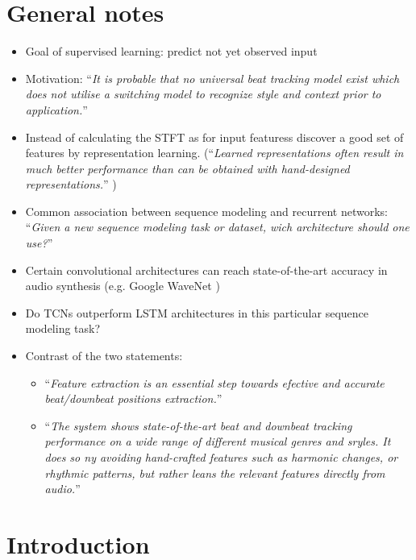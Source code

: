 \documentclass{scrartcl}
\begin{document}
\pagestyle{empty}


\tableofcontents
\newpage


\section*{General notes}
\begin{itemize}
\item Goal of supervised learning: predict not yet observed input
\item Motivation: ``\emph{It is probable that no universal beat tracking model exist which does not utilise a switching model to recognize style and context prior to application.}'' \cite[Collins2006]{Collins2006}
\item Instead of calculating the STFT as for input featuress discover a good set of features by representation learning. (``\emph{Learned representations often result in much better performance than can be obtained with hand-designed representations.}'' \cite[Goodfellow2016]{Goodfellow2016})
\item Common association between sequence modeling and recurrent networks: ``\emph{Given a new sequence modeling task or dataset, wich architecture should one use?}'' \cite[Bai2018]{Bai2018}
\item Certain convolutional architectures can reach state-of-the-art accuracy in audio synthesis (e.g. Google WaveNet \cite[Oord2016]{Oord2016})
\item Do TCNs outperform LSTM architectures in this particular sequence modeling task?
\item Contrast of the two statements:
\begin{itemize}
\item ``\emph{Feature extraction is an essential step towards efective and accurate beat/downbeat positions extraction.}'' \cite[Khadkevich2012]{Khadkevich2012}
\item ``\emph{The system shows state-of-the-art beat and downbeat tracking performance on a wide range of different musical genres and sryles. It does so ny avoiding hand-crafted features such as harmonic changes, or rhythmic patterns, but rather leans the relevant features directly from audio.}'' \cite[Boeck2016b]{Boeck2016b}
\end{itemize} 
\end{itemize}

\newpage


\section{Introduction}
\end{document}
